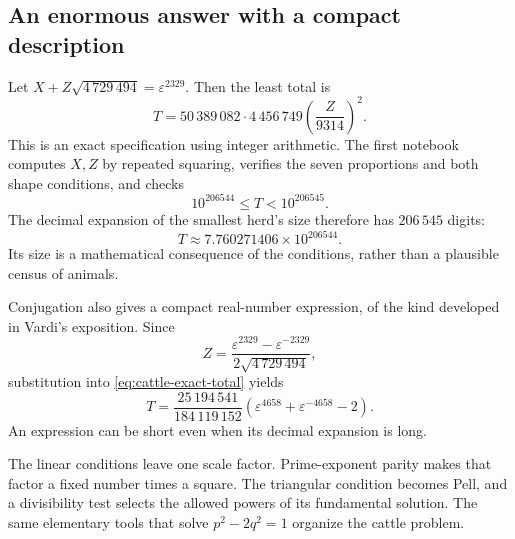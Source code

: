 \subsection*{An enormous answer with a compact description}
Let $X+Z\sqrt{4\,729\,494}=\varepsilon^{2329}$. Then the least total is
\begin{equation}\label{eq:cattle-exact-total}
 T=50\,389\,082\cdot4\,456\,749
       \left(\frac{Z}{9314}\right)^2.
\end{equation}
This is an exact specification using integer arithmetic. The first
notebook computes $X,Z$ by repeated squaring, verifies the seven
proportions and both shape conditions, and checks
\[
 10^{206544}\le T<10^{206545}.
\]
The decimal expansion of the smallest herd's size therefore has
$206\,545$ digits:
\[
 T\approx7.760271406\times10^{206544}.
\]
Its size is a mathematical consequence of the conditions, rather than
a plausible census of animals.

Conjugation also gives a compact real-number expression, of the kind
developed in Vardi's exposition. Since
\[
 Z=\frac{\varepsilon^{2329}-\varepsilon^{-2329}}
          {2\sqrt{4\,729\,494}},
\]
substitution into \eqref{eq:cattle-exact-total} yields
\[
 T=\frac{25\,194\,541}{184\,119\,152}
       \left(\varepsilon^{4658}+\varepsilon^{-4658}-2\right).
\]
An expression can be short even when its decimal expansion is long.

\begin{bigidea}
The linear conditions leave one scale factor. Prime-exponent parity
makes that factor a fixed number times a square. The triangular
condition becomes Pell, and a divisibility test selects the allowed
powers of its fundamental solution. The same elementary tools that
solve $p^2-2q^2=1$ organize the cattle problem.
\end{bigidea}
